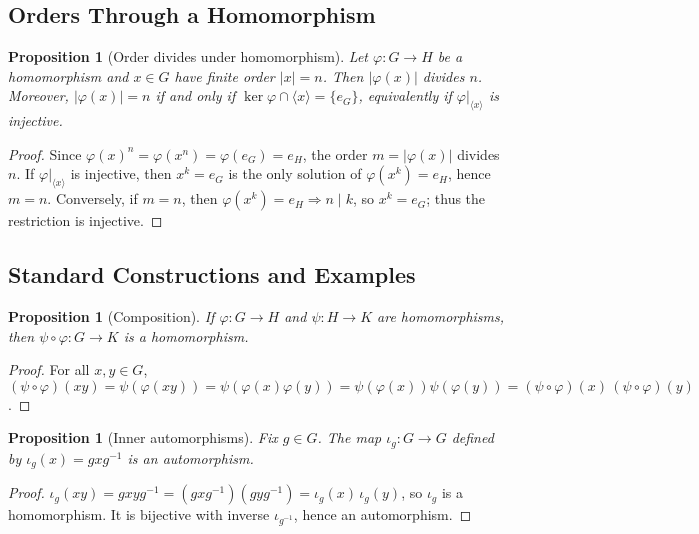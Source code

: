 \documentclass[12pt]{article}
\newtheorem{proposition}[theorem]{Proposition}
\theoremstyle{definition}
\begin{document}
\subsection*{Orders Through a Homomorphism}

\begin{proposition}[Order divides under homomorphism]
Let $\varphi:G\to H$ be a homomorphism and $x\in G$ have finite order $|x|=n$.
Then $|\varphi(x)|$ divides $n$. Moreover, $|\varphi(x)|=n$ if and only if $\ker\varphi\cap \langle x\rangle=\{e_G\}$,
equivalently if $\varphi|_{\langle x\rangle}$ is injective.
\end{proposition}

\begin{proof}
Since $\varphi(x)^n=\varphi(x^n)=\varphi(e_G)=e_H$, the order $m=|\varphi(x)|$ divides $n$.
If $\varphi|_{\langle x\rangle}$ is injective, then $x^k=e_G$ is the only solution of $\varphi(x^k)=e_H$, hence $m=n$.
Conversely, if $m=n$, then $\varphi(x^k)=e_H \Rightarrow n\mid k$, so $x^k=e_G$; thus the restriction is injective.
\end{proof}

\subsection*{Standard Constructions and Examples}

\begin{proposition}[Composition]
If $\varphi:G\to H$ and $\psi:H\to K$ are homomorphisms, then $\psi\circ\varphi:G\to K$ is a homomorphism.
\end{proposition}

\begin{proof}
For all $x,y\in G$,
$(\psi\circ\varphi)(xy)=\psi(\varphi(xy))=\psi(\varphi(x)\varphi(y))=\psi(\varphi(x))\psi(\varphi(y))
=(\psi\circ\varphi)(x)\,(\psi\circ\varphi)(y)$.
\end{proof}

\begin{proposition}[Inner automorphisms]
Fix $g\in G$. The map $\iota_g:G\to G$ defined by $\iota_g(x)=gxg^{-1}$ is an automorphism.
\end{proposition}

\begin{proof}
$\iota_g(xy)=gxyg^{-1}=(gxg^{-1})(gyg^{-1})=\iota_g(x)\,\iota_g(y)$, so $\iota_g$ is a homomorphism.
It is bijective with inverse $\iota_{g^{-1}}$, hence an automorphism.
\end{proof}
\end{document}
